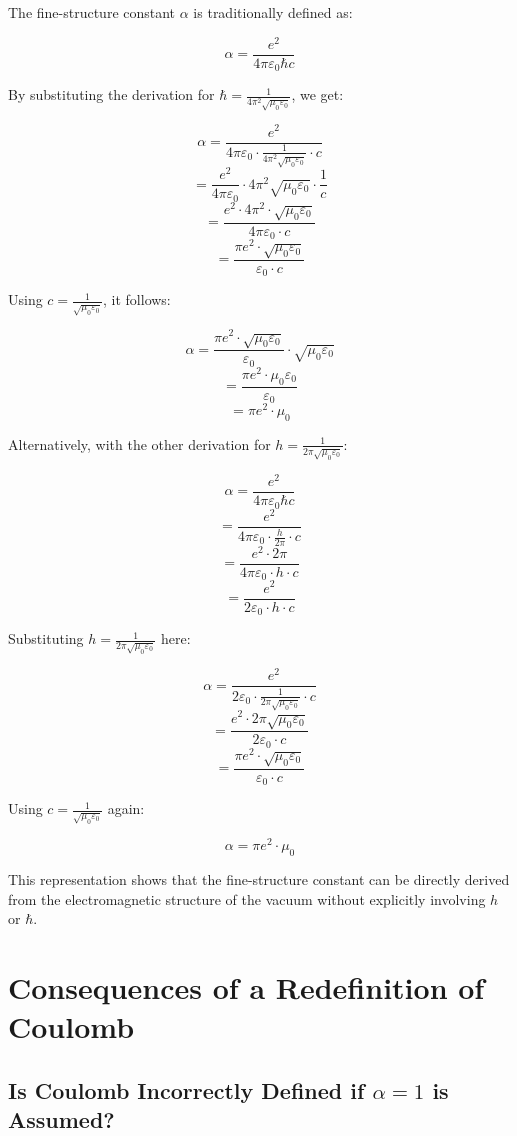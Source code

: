 \documentclass{article}
\begin{document}
	The fine-structure constant $\alpha$ is traditionally defined as:
	
	$$\alpha = \frac{e^2}{4\pi\varepsilon_0\hbar c}$$
	
	By substituting the derivation for $\hbar = \frac{1}{4\pi^2\sqrt{\mu_0\varepsilon_0}}$, we get:
	
	$$\alpha = \frac{e^2}{4\pi\varepsilon_0 \cdot \frac{1}{4\pi^2\sqrt{\mu_0\varepsilon_0}} \cdot c}$$
	$$= \frac{e^2}{4\pi\varepsilon_0} \cdot 4\pi^2\sqrt{\mu_0\varepsilon_0} \cdot \frac{1}{c}$$
	$$= \frac{e^2 \cdot 4\pi^2 \cdot \sqrt{\mu_0\varepsilon_0}}{4\pi\varepsilon_0 \cdot c}$$
	$$= \frac{\pi e^2 \cdot \sqrt{\mu_0\varepsilon_0}}{\varepsilon_0 \cdot c}$$
	
	Using $c = \frac{1}{\sqrt{\mu_0\varepsilon_0}}$, it follows:
	
	$$\alpha = \frac{\pi e^2 \cdot \sqrt{\mu_0\varepsilon_0}}{\varepsilon_0} \cdot \sqrt{\mu_0\varepsilon_0}$$
	$$= \frac{\pi e^2 \cdot \mu_0\varepsilon_0}{\varepsilon_0}$$
	$$= \pi e^2 \cdot \mu_0$$
	
	Alternatively, with the other derivation for $h = \frac{1}{2\pi\sqrt{\mu_0\varepsilon_0}}$:
	
	$$\alpha = \frac{e^2}{4\pi\varepsilon_0\hbar c}$$
	$$= \frac{e^2}{4\pi\varepsilon_0 \cdot \frac{h}{2\pi} \cdot c}$$
	$$= \frac{e^2 \cdot 2\pi}{4\pi\varepsilon_0 \cdot h \cdot c}$$
	$$= \frac{e^2}{2\varepsilon_0 \cdot h \cdot c}$$
	
	Substituting $h = \frac{1}{2\pi\sqrt{\mu_0\varepsilon_0}}$ here:
	
	$$\alpha = \frac{e^2}{2\varepsilon_0 \cdot \frac{1}{2\pi\sqrt{\mu_0\varepsilon_0}} \cdot c}$$
	$$= \frac{e^2 \cdot 2\pi\sqrt{\mu_0\varepsilon_0}}{2\varepsilon_0 \cdot c}$$
	$$= \frac{\pi e^2 \cdot \sqrt{\mu_0\varepsilon_0}}{\varepsilon_0 \cdot c}$$
	
	Using $c = \frac{1}{\sqrt{\mu_0\varepsilon_0}}$ again:
	
	$$\alpha = \pi e^2 \cdot \mu_0$$
	
	This representation shows that the fine-structure constant can be directly derived from the electromagnetic structure of the vacuum without explicitly involving $h$ or $\hbar$.
	
	\section{Consequences of a Redefinition of Coulomb}
	
	\subsection{Is Coulomb Incorrectly Defined if $\alpha = 1$ is Assumed?}
	
\end{document}
